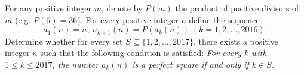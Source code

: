 \documentclass{article}
\begin{document}
\setlength{\parindent}{0pt}
For any positive integer $m$, denote by $P\left(m\right)$ the product of positive divisors of $m$ (e.g. $P(6)=36$). For every positive integer $n$ define the sequence 
$$ a_1(n)=n,\;a_{k+1}(n)=P(a_k(n))\;(k=1,2,\ldots,2016). $$
Determine whether for every set $S\subseteq\{1,2,\ldots,2017\}$, there exists a positive integer $n$ such that the following condition is satisfied:\newline
\emph{For every $k$ with $1\le k\le	2017$, the number $a_k(n)$ is a perfect square if and only if $k\in	S$.}
\end{document}
